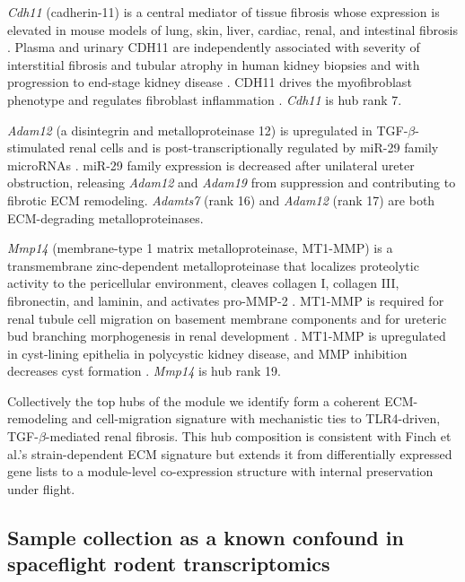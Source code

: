 \documentclass[11pt]{article}
\newcommand{\gene}[1]{\textit{#1}}
\begin{document}
\emph{\gene{Cdh11}} (cadherin-11) is a central mediator of tissue fibrosis whose expression is elevated in mouse models of lung, skin, liver, cardiac, renal, and intestinal fibrosis \citep{schneider2012cadherin11, bischoff2022cdh11}. Plasma and urinary CDH11 are independently associated with severity of interstitial fibrosis and tubular atrophy in human kidney biopsies and with progression to end-stage kidney disease \citep{kawano2021cdh11}. CDH11 drives the myofibroblast phenotype and regulates fibroblast inflammation \citep{bischoff2022cdh11}. \emph{\gene{Cdh11}} is hub rank 7.

\emph{\gene{Adam12}} (a disintegrin and metalloproteinase 12) is upregulated in TGF-$\beta$-stimulated renal cells and is post-transcriptionally regulated by miR-29 family microRNAs \citep{ramachandran2013adam12}. miR-29 family expression is decreased after unilateral ureter obstruction, releasing \gene{Adam12} and \gene{Adam19} from suppression and contributing to fibrotic ECM remodeling. \emph{\gene{Adamts7}} (rank 16) and \emph{\gene{Adam12}} (rank 17) are both ECM-degrading metalloproteinases.

\emph{\gene{Mmp14}} (membrane-type 1 matrix metalloproteinase, MT1-MMP) is a transmembrane zinc-dependent metalloproteinase that localizes proteolytic activity to the pericellular environment, cleaves collagen I, collagen III, fibronectin, and laminin, and activates pro-MMP-2 \citep{itoh2015mmp14}. MT1-MMP is required for renal tubule cell migration on basement membrane components and for ureteric bud branching morphogenesis in renal development \citep{riggins2010mt1mmp}. MT1-MMP is upregulated in cyst-lining epithelia in polycystic kidney disease, and MMP inhibition decreases cyst formation \citep{obermuller2001mmp}. \emph{\gene{Mmp14}} is hub rank 19.

Collectively the top hubs of the module we identify form a coherent ECM-remodeling and cell-migration signature with mechanistic ties to TLR4-driven, TGF-$\beta$-mediated renal fibrosis. This hub composition is consistent with Finch et al.'s strain-dependent ECM signature \citep{finch2025strain} but extends it from differentially expressed gene lists to a module-level co-expression structure with internal preservation under flight.

\subsection{Sample collection as a known confound in spaceflight rodent transcriptomics}
\end{document}
